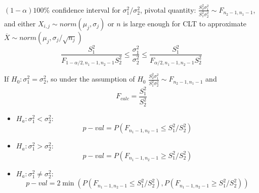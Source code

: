 \documentclass[12pt, a4paper, twoside, openright, titlepage]{book}
\begin{document}
\begin{rec}{}{}
    $(1-\alpha)100\%$ confidence interval for $\sigma_1^2/\sigma_2^2$, pivotal quantity: $\frac{S_2^2\sigma_1^2}{S_1^2\sigma_2^2}\sim F_{n_2-1,n_1-1}$, and either $X_{i,j} \sim norm(\mu_j,\sigma_j)$ or $n$ is large enough for CLT to approximate $\overline{X} \sim norm(\mu_j, \sigma_j/\sqrt{n_j})$ \begin{equation*}
        \frac{S_1^2}{F_{1-\alpha/2,n_1-1,n_2-1}S_2^2} \leq \frac{\sigma_1^2}{\sigma_2^2} \leq \frac{S_1^2}{F_{\alpha/2,n_1-1,n_2-1}S_2^2}
    \end{equation*}
\end{rec}

If $H_0: \sigma_1^2 = \sigma_2^2$, so under the assumption of $H_0$ $\frac{S_2^2\sigma_1^2}{S_1^2\sigma_2^2}\sim F_{n_2-1,n_1-1}$ and \begin{equation*}
    F_{calc} = \frac{S_1^2}{S_2^2}
\end{equation*}
\begin{itemize}
        \item $H_a: \sigma_1^2 < \sigma_2^2$: $$p-val = P(F_{n_1-1,n_2-1}\leq S_1^2/S_2^2)$$
        \item $H_a: \sigma_1^2 > \sigma_2^2$: $$p-val = P(F_{n_1-1,n_2-1}\geq S_1^2/S_2^2)$$
        \item $H_a: \sigma_1^2 \neq \sigma_2^2$: $$p-val = 2\min(P(F_{n_1-1,n_2-1}\leq S_1^2/S_2^2),P(F_{n_1-1,n_2-1}\geq S_1^2/S_2^2))$$
\end{itemize}
\end{document}
